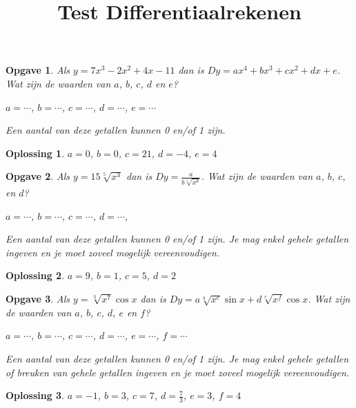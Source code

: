 \documentclass{article}
\title{Test Differentiaalrekenen}
\date { }
\newtheorem{opgave}{Opgave}
\newtheorem*{oplossing}{Oplossing}
\begin{document}
\maketitle \noindent

\begin{opgave}
Als $y=7x^3-2x^2+4x-11$ dan is $Dy=ax^4+bx^3+cx^2+dx+e$. Wat zijn de waarden van $a$, $b$, $c$, $d$ en $e$?\vspace{2mm}

\noindent $a= \cdots$, $b=\cdots$, $c=\cdots$, $d=\cdots$, $e=\cdots$\vspace{1mm}

\noindent Een aantal van deze getallen kunnen 0 en/of 1 zijn.
\end{opgave}

\begin{oplossing}
$a=0$, $b=0$, $c=21$, $d=-4$, $e=4$
\end{oplossing}

\begin{opgave}
Als $y=15\sqrt[5]{x^3}$ dan is $Dy=\frac{a}{b\sqrt[c]{x^d}}$. Wat zijn de waarden van $a$, $b$, $c$, en $d$?\vspace{2mm}

\noindent $a= \cdots$, $b=\cdots$, $c=\cdots$, $d=\cdots$, \vspace{1mm}

\noindent Een aantal van deze getallen kunnen 0 en/of 1 zijn. Je mag enkel gehele getallen ingeven en je moet zoveel mogelijk vereenvoudigen.
\end{opgave}

\begin{oplossing}
$a=9$, $b=1$, $c=5$, $d=2$
\end{oplossing}

\begin{opgave}
Als $y=\sqrt[3]{x^7}\cos x$ dan is $Dy=a\sqrt[b]{x^c}\sin x+d\sqrt[e]{x^f}\cos x$. Wat zijn de waarden van $a$, $b$, $c$, $d$, $e$ en $f$?\vspace{2mm}

\noindent $a= \cdots$, $b=\cdots$, $c=\cdots$, $d=\cdots$, $e=\cdots$, $f=\cdots$ \vspace{1mm}

\noindent Een aantal van deze getallen kunnen 0 en/of 1 zijn. Je mag enkel gehele getallen of breuken van gehele getallen ingeven en je moet zoveel mogelijk vereenvoudigen.
\end{opgave}

\begin{oplossing}
$a=-1$, $b=3$, $c=7$, $d=\frac{7}{3}$, $e=3$, $f=4$
\end{oplossing}
\end{document}
